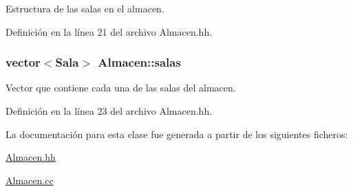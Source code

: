 Estructura de las salas en el almacen. 



Definición en la línea 21 del archivo Almacen.\+hh.

\subsubsection[{\texorpdfstring{salas}{salas}}]{\setlength{\rightskip}{0pt plus 5cm}vector$<${\bf Sala}$>$ Almacen\+::salas\hspace{0.3cm}{\ttfamily [private]}}\hypertarget{class_almacen_a5c60aa6a014eb6a96a2f5c6fb9a83e52}{}\label{class_almacen_a5c60aa6a014eb6a96a2f5c6fb9a83e52}


Vector que contiene cada una de las salas del almacen. 



Definición en la línea 23 del archivo Almacen.\+hh.



La documentación para esta clase fue generada a partir de los siguientes ficheros\+:\begin{DoxyCompactItemize}
\item 
\hyperlink{_almacen_8hh}{Almacen.\+hh}\item 
\hyperlink{_almacen_8cc}{Almacen.\+cc}\end{DoxyCompactItemize}
